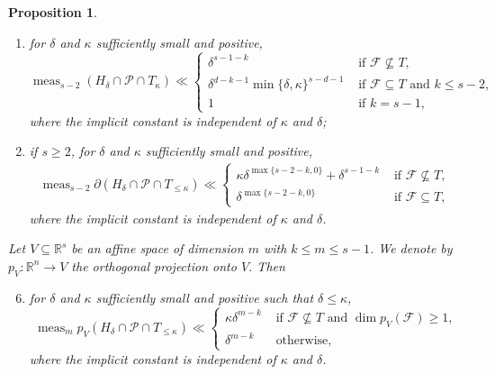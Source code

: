 \documentclass[JEP,XML,SOM,Unicode,published]{cedram}
\newenvironment{enumeratei}
{\bgroup\def\theenumi{\roman{enumi}}\def\theenumii{\arabic{enumii}}\begin{enumerate}}
{\end{enumerate}\egroup}
\let\del\delta
\newcommand{\calP}{\mathcal{P}}
\newcommand\RR{\mathbb{R}}
\DeclareMathOperator{\meas}{meas}
\newtheorem{prop}[theorem]{Proposition}
\theoremstyle{definition}
\numberwithin{theorem}{section}
\begin{document}
\begin{prop}
\begin{enumeratei}
\[\meas_{s-1} (H_\delta \cap \mathcal P \cap T_{\leq \kappa}) \ll \begin{cases}
\kappa \delta^{s-1-k} & \text{ if } \mathcal F\not\subseteq T,\\
\min\{\kappa,\delta\} \delta^{s-2-k} & \text{ if } \mathcal F\subseteq T,
\end{cases}
\]
where the implicit constant is independent of $\kappa$ and $\delta$;
\item
\label{item:volume_s-2_delta_kappa}
for $\delta$ and $\kappa$ sufficiently small and positive,
\[
\meas_{s-2} (H_\delta \cap \mathcal P \cap T_{\kappa}) \ll \begin{cases}
\delta^{s-1-k} & \text{ if } \mathcal F\not\subseteq T,\\
\delta^{d-k-1}\min\{\delta,\kappa\}^{s-d-1} & \text{ if } \mathcal F\subseteq T \text{ and } k\leq s-2,\\
1 & \text{ if } k=s-1,
\end{cases}
\]
where the implicit constant is independent of $\kappa$ and $\delta$;
\item
\label{item:volume_boundary_kappa}
if $s\geq 2$, for $\delta$ and $\kappa$ sufficiently small and positive,
\begin{gather*}
\meas_{s-2} \partial (H_{\del}\cap \calP\cap T_{\leq\kappa})
\ll\begin{cases}
\kappa \del^{\max\{s-2-k,0\}} + \del^{s-1-k} & \text{ if } \mathcal F\not\subseteq T, \\
\delta^{\max\{s-2-k, 0\}} & \text{ if } \mathcal F\subseteq T,
\end{cases}
\end{gather*}
where the implicit constant is independent of $\kappa$ and $\delta$.
\end{enumeratei}
Let $V\subseteq\RR^s$ be an affine space of dimension $m$ with $k\leq m\leq s-1$. We denote by $p_V:\RR^n\to V$ the orthogonal projection onto $V$. Then
\begin{enumeratei}\setcounter{enumi}{5}
\item
\label{item:volume_proj}
for $\delta$ and $\kappa$ sufficiently small and positive such that $\delta\leq\kappa$,
\begin{equation*}
\meas_mp_V(H_\delta\cap\mathcal P\cap T_{\leq \kappa})
\ll \begin{cases}
\kappa \delta^{m-k} & \text{ if $\mathcal F\nsubseteq T$ and $\dim p_V(\mathcal F)\geq 1$,}\\
\delta^{m-k} & \text{ otherwise,}
\end{cases}
\end{equation*}
where the implicit constant is independent of $\kappa$ and $\delta$.
\end{enumeratei}
\end{prop}
\end{document}
